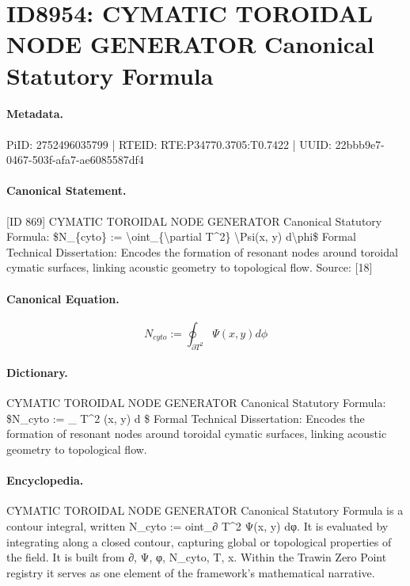 \section*{ID8954: CYMATIC TOROIDAL NODE GENERATOR Canonical Statutory Formula}
\paragraph{Metadata.}
PiID: 2752496035799 | RTEID: RTE:P34770.3705:T0.7422 | UUID: 22bbb9e7-0467-503f-afa7-ae6085587df4

\paragraph{Canonical Statement.}
[ID 869] CYMATIC TOROIDAL NODE GENERATOR Canonical Statutory Formula: \$N\_\{cyto\} := \textbackslash{}oint\_\{\textbackslash{}partial T\textasciicircum{}2\} \textbackslash{}Psi(x, y) d\textbackslash{}phi\$ Formal Technical Dissertation: Encodes the formation of resonant nodes around toroidal cymatic surfaces, linking acoustic geometry to topological flow. Source: [18]

\paragraph{Canonical Equation.}
\[
N_{cyto} := \oint_{\partial T^2} \Psi(x, y) d\phi
\]

\paragraph{Dictionary.}
CYMATIC TOROIDAL NODE GENERATOR Canonical Statutory Formula: \$N\_cyto := \_ T\textasciicircum{}2 (x, y) d \$ Formal Technical Dissertation: Encodes the formation of resonant nodes around toroidal cymatic surfaces, linking acoustic geometry to topological flow.

\paragraph{Encyclopedia.}
CYMATIC TOROIDAL NODE GENERATOR Canonical Statutory Formula is a contour integral, written N\_cyto := oint\_∂ T\textasciicircum{}2 Ψ(x, y) dφ. It is evaluated by integrating along a closed contour, capturing global or topological properties of the field. It is built from ∂, Ψ, φ, N\_cyto, T, x. Within the Trawin Zero Point registry it serves as one element of the framework's mathematical narrative.
